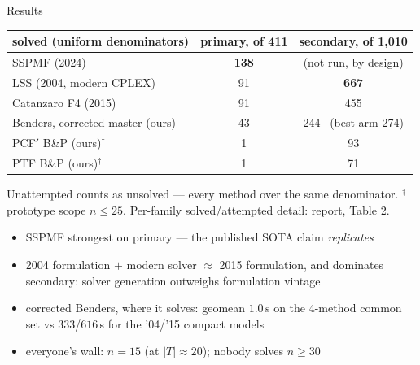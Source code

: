 \documentclass[10pt]{beamer}
\begin{document}
\begin{frame}{Results}
\begin{center}
\begin{tabular}{lcc}
\toprule
solved (uniform denominators) & primary, of 411 & secondary, of 1{,}010\\
\midrule
SSPMF (2024)                     & \textbf{138} & (not run, by design)\\
LSS (2004, modern CPLEX)         & 91           & \textbf{667}\\
Catanzaro F4 (2015)              & 91           & 455\\
Benders, corrected master (ours) & 43           & 244 \ (best arm 274)\\
PCF$'$ B\&P (ours)$^{\dagger}$  & 1            & 93\\
PTF B\&P (ours)$^{\dagger}$     & 1            & 71\\
\bottomrule
\end{tabular}

{\scriptsize Unattempted counts as unsolved --- every method over the same
denominator. $^{\dagger}$prototype scope $n\le25$. Per-family solved/attempted
detail: report, Table 2.}
\end{center}
\vspace{1mm}
\pause
\begin{itemize}
  \item SSPMF strongest on primary --- the published SOTA claim \emph{replicates}
  \item 2004 formulation $+$ modern solver $\approx$ 2015 formulation, and
        dominates secondary: solver generation outweighs formulation vintage
  \item corrected Benders, where it solves: geomean $1.0$\,s on the 4-method
        common set vs $333$/$616$\,s for the '04/'15 compact models
  \item everyone's wall: $n=15$ (at $|T|\approx20$); nobody solves $n\ge30$
\end{itemize}
\end{frame}
\end{document}
